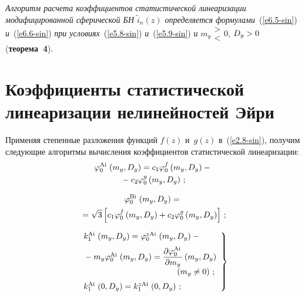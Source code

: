 \begin{multicols}{2}
 \smallskip

\textit{Алгоритм расчета коэффициентов статистической линеаризации 
модифицированной сферической БН $\tilde i_n(z)$  
определяется формулами}~(\ref{e6.5-sin}) \textit{и}~(\ref{e6.6-sin}) 
\textit{при условиях}~(\ref{e5.8-sin}) \textit{и}~(\ref{e5.9-sin}) 
\textit{и} $m_y \begin{matrix}
>\\  <\end{matrix} %
 0$, $D_y \hm>0$ (\textbf{теорема~4}).

\section{Коэффициенты статистической линеаризации нелинейностей Эйри}

Применяя степенные разложения функций  $f(z)$ и~$g(z)$ в~(\ref{e2.8-sin}),
получим следующие алгоритмы вы\-чис\-ле\-ния коэффициентов статистической линеаризации:
  \begin{multline}
  \varphi_0^{\mathrm{Ai}\,} \left(m_y, D_y\right) = 
    c_1 \varphi_0^f \left(m_y, D_y\right) -{}\\
    {}- c_2 \varphi_0^g \left(m_y, D_y\right)\,;
    \label{e7.1-sin}
    \end{multline}
    
    \vspace*{-12pt}
    
    \noindent
    \begin{multline}
    \varphi_0^{\mathrm{Bi}\,} \left(m_y, D_y\right) = {}\\
    {}=
    \sqrt{3} \left[ c_1 \varphi_0^f \left(m_y, D_y\right) +
     c_2 \varphi_0^g \left(m_y, D_y\right)\right]\,;\label{e7.2-sin}
     \end{multline}
     
     
     \noindent
     \begin{equation}
     \left.
     \begin{array}{l}
    k_1^{\Ai} \left(m_y, D_y\right) = \varphi_0^{z\Ai} \left(m_y, D_y\right) -{}\\[6pt]
    {}-
     m_y \varphi_0^{\Ai} \left(m_y, D_y\right) = 
     \fr{\prt \varphi_0^{\Ai}}{\prt m_y} \left(m_y, D_y\right)\\[6pt] 
    \hspace*{40mm} \left(m_y\ne 0\right)\,;\\[6pt]
         k_1^{\Ai} \left(0, D_y\right) = k_1^{z\Ai} \left(0, D_y\right)\,;
     \end{array}
     \right\}
     \label{e7.3-sin}
    \end{equation}
   

\end{multicols}
